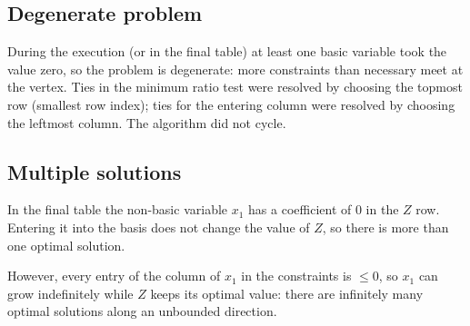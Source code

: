 \subsection*{Degenerate problem}
During the execution (or in the final table) at least one basic variable took the value zero, so the problem is degenerate: more constraints than necessary meet at the vertex. Ties in the minimum ratio test were resolved by choosing the topmost row (smallest row index); ties for the entering column were resolved by choosing the leftmost column. The algorithm did not cycle.
\subsection*{Multiple solutions}
In the final table the non-basic variable $x_{1}$ has a coefficient of $0$ in the $Z$ row. Entering it into the basis does not change the value of $Z$, so there is more than one optimal solution.

However, every entry of the column of $x_{1}$ in the constraints is $\le 0$, so $x_{1}$ can grow indefinitely while $Z$ keeps its optimal value: there are infinitely many optimal solutions along an unbounded direction.

